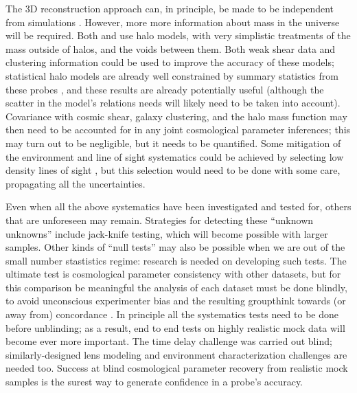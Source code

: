 The 3D reconstruction approach can, in principle, be made to be
independent from simulations \citep[indeed, this was a design feature
of][]{McCullyEtal2014}.  However, more  more information about mass in
the universe will be required.  Both \citet{McCullyEtal2014} and
\citet{CollettEtal2013} use halo models, with very simplistic treatments
of the mass outside of halos, and the voids between them. Both weak
shear data and clustering information could be used to improve the
accuracy of these  models; statistical halo models are already well
constrained by summary statistics from these probes
\citep[e.g.][]{CouponEtal2015},  and these results are already
potentially useful (although the scatter in the model's relations needs
will likely need to be taken into account).  Covariance with cosmic
shear, galaxy clustering, and the halo mass function may then  need to
be accounted for in any joint cosmological parameter inferences; this
may turn out to be negligible, but it needs to be quantified.  Some
mitigation of the environment and line of sight systematics could be
achieved by selecting low density lines of sight
\citep{CollettEtal2013}, but this selection would need to be done with
some care, propagating all the uncertainties.


Even when all the above systematics have been investigated and tested
for, others that are unforeseen may remain. Strategies for detecting
these ``unknown unknowns'' include jack-knife testing, which  will
become possible with larger samples. Other kinds of ``null tests'' may
also be possible when we are out of the small number stastistics regime:
research is needed on developing such tests. The ultimate test is
cosmological parameter consistency with other datasets, but for this
comparison be meaningful the analysis of each dataset must be done
blindly, to avoid unconscious experimenter bias and the resulting
groupthink towards (or away from) concordance
\citep[see e.g.][]{ConleyEtal2006,SuyuEtal2013}. In principle all the
systematics tests  need to be done before unblinding; as a result, end
to end tests on highly realistic mock data will become ever more
important. The time delay challenge was carried out blind;
similarly-designed lens modeling and environment characterization
challenges are needed too. Success at blind cosmological parameter
recovery from realistic mock samples is the surest way to generate
confidence in a probe's accuracy.



